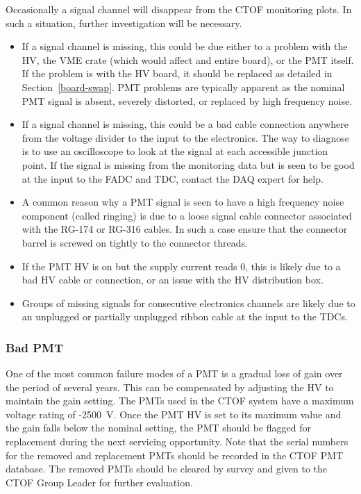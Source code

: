 \documentclass[12pt]{article}
\begin{document}
Occasionally a signal channel will disappear from the CTOF monitoring plots. In such a 
situation, further investigation will be necessary. 

\begin{itemize}
\item If a signal channel is missing, this could be due either to a problem with 
the HV, the VME crate (which would affect and entire board), or the PMT itself. If 
the problem is with the HV board, it should be replaced as detailed in 
Section~\ref{board-swap}. PMT problems are typically apparent as the nominal PMT 
signal is absent, severely distorted, or replaced by high frequency noise.
\item If a signal channel is missing, this could be a bad cable connection anywhere 
from the voltage divider to the input to the electronics. The way to diagnose is to 
use an oscilloscope to look at the signal at each accessible junction point. If the 
signal is missing from the monitoring data but is seen to be good at the input to 
the FADC and TDC, contact the DAQ expert for help.
\item A common reason why a PMT signal is seen to have a high frequency noise 
component (called ringing) is due to a loose signal cable connector associated with 
the RG-174 or RG-316 cables. In such a case ensure that the connector barrel is 
screwed on tightly to the connector threads.
\item If the PMT HV is on but the supply current reads 0, this is likely due to a bad 
HV cable or connection, or an issue with the HV distribution box.
\item Groups of missing signals for consecutive electronics channels are likely due to 
an unplugged or partially unplugged ribbon cable at the input to the TDCs.
\end{itemize}

\subsubsection{Bad PMT}
\label{bad-pmt}

One of the most common failure modes of a PMT is a gradual loss of gain over the 
period of several years. This can be compensated by adjusting the HV to maintain 
the gain setting. The PMTs used in the CTOF system have a maximum voltage rating 
of -2500~V. Once the PMT HV is set to its maximum value and the gain falls below 
the nominal setting, the PMT should be flagged for replacement during the next 
servicing opportunity. Note that the serial numbers for the removed and replacement 
PMTs should be recorded in the CTOF PMT database. The removed PMTs should be
cleared by survey and given to the CTOF Group Leader for further evaluation.
\end{document}

